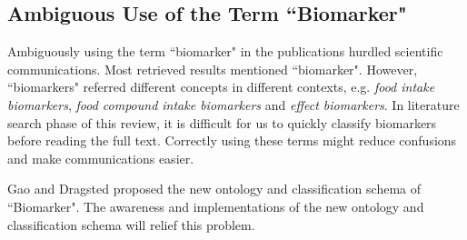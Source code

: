 


\subsection{Ambiguous Use of the Term ``Biomarker"}
Ambiguously using the term ``biomarker" in the publications hurdled scientific communications. 
Most retrieved results mentioned ``biomarker". However, ``biomarkers" referred different concepts in different contexts, e.g. \textit{food intake biomarkers}, \textit{food compound intake biomarkers} and \textit{effect biomarkers}. In literature search phase of this review, it is difficult for us to quickly classify biomarkers before reading the full text. Correctly using these terms might reduce confusions and make communications easier. 

Gao\cite{Gao2017} and Dragsted\cite{Dragsted2017} proposed the new ontology and classification schema of ``Biomarker". The awareness and implementations of the new ontology and classification schema will relief this problem.





